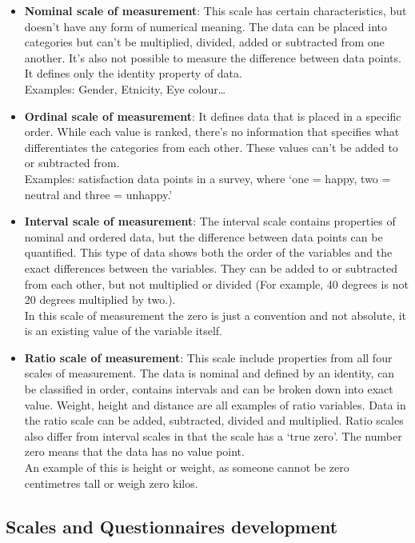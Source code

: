 \documentclass[
  letterpaper,
  DIV=11,
  numbers=noendperiod]{scrartcl}
\begin{document}
\begin{itemize}
\item
  \textbf{Nominal scale of measurement}: This scale has certain
  characteristics, but doesn't have any form of numerical meaning. The
  data can be placed into categories but can't be multiplied, divided,
  added or subtracted from one another. It's also not possible to
  measure the difference between data points. It defines only the
  identity property of data.\\
  Examples: Gender, Etnicity, Eye colour\ldots{}
\item
  \textbf{Ordinal scale of measurement}: It defines data that is placed
  in a specific order. While each value is ranked, there's no
  information that specifies what differentiates the categories from
  each other. These values can't be added to or subtracted from.\\
  Examples: satisfaction data points in a survey, where `one = happy,
  two = neutral and three = unhappy.'
\item
  \textbf{Interval scale of measurement}: The interval scale contains
  properties of nominal and ordered data, but the difference between
  data points can be quantified. This type of data shows both the order
  of the variables and the exact differences between the variables. They
  can be added to or subtracted from each other, but not multiplied or
  divided (For example, 40 degrees is not 20 degrees multiplied by
  two.).\\
  In this scale of measurement the zero is just a convention and not
  absolute, it is an existing value of the variable itself.
\item
  \textbf{Ratio scale of measurement}: This scale include properties
  from all four scales of measurement. The data is nominal and defined
  by an identity, can be classified in order, contains intervals and can
  be broken down into exact value. Weight, height and distance are all
  examples of ratio variables. Data in the ratio scale can be added,
  subtracted, divided and multiplied. Ratio scales also differ from
  interval scales in that the scale has a `true zero'. The number zero
  means that the data has no value point.\\
  An example of this is height or weight, as someone cannot be zero
  centimetres tall or weigh zero kilos.
\end{itemize}

\hypertarget{scales-and-questionnaires-development}{%
\subsection{Scales and Questionnaires
development}\label{scales-and-questionnaires-development}}
\end{document}
